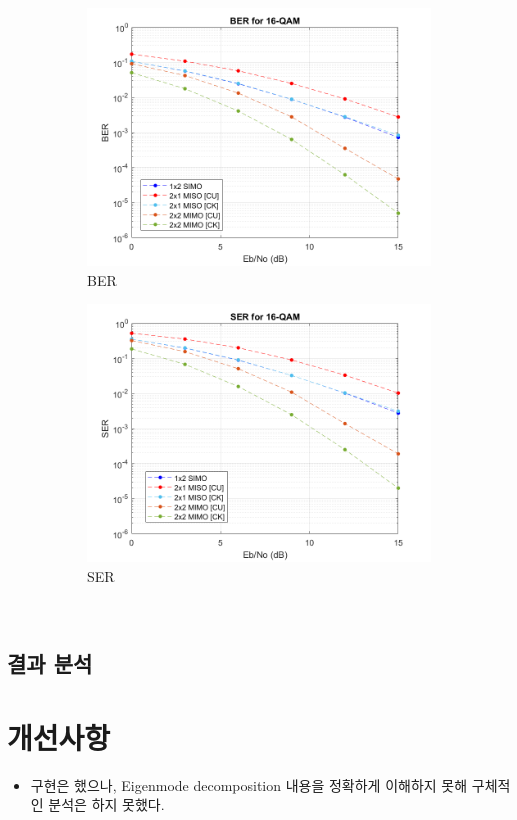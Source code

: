 \documentclass{article}
\begin{document}
\begin{figure}[H]
\begin{subfigure}{0.5\textwidth}
		\centerline{\includegraphics[width=1\textwidth]{16qamber_eb.png}}
		\caption{BER}
	\end{subfigure}%
	\begin{subfigure}{0.5\textwidth}
		\centerline{\includegraphics[width=1\textwidth]{16qamser_eb.png}}
		\caption{SER}
	\end{subfigure}\\%
	\caption{}
\end{figure}

\subsection{결과 분석}

\section{개선사항}
\begin{itemize}
	\item 구현은 했으나, Eigenmode decomposition 내용을 정확하게 이해하지 못해 구체적인 분석은 하지 못했다.
\end{itemize}
\end{document}
